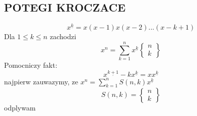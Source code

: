 \documentclass{article}
\begin{document}
\subsection*{POTEGI KROCZACE}
$$x^{\underline{k}}=x(x-1)x(x-2)...(x-k+1)$$
Dla $1\leq k\leq n$ zachodzi
$$x^n=\sum\limits_{k=1}^nx^{\underline k}\begin{Bmatrix}n\\k\end{Bmatrix}$$
\dowod
Pomocniczy fakt:
$$x^{\underline {k+1}}-kx^{\underline k}=xx^{\underline{k}}$$
najpierw zauwazymy, ze $x^n=\sum\limits_{k=1}^n S(n,k)x^{\underline k}$
$$S(n,k)=\begin{Bmatrix}n\\k\end{Bmatrix}$$
odplywam
\end{document}
